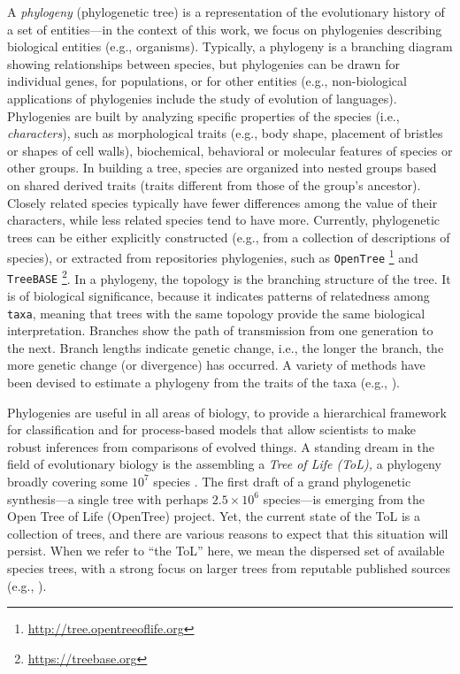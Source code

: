 \documentclass{new_tlp}
\begin{document}
A \emph{phylogeny} (phylogenetic tree) is a representation of the evolutionary history of a set of entities---in the context of
this work, we focus on phylogenies describing biological entities (e.g., organisms). Typically, 
a phylogeny is a branching diagram showing relationships between species, but phylogenies can be drawn for individual 
genes, for populations, or for other entities (e.g., non-biological applications of phylogenies include the study
of evolution of languages). Phylogenies are built by analyzing specific properties of the species
(i.e., \emph{characters}), such as morphological traits (e.g., body shape, placement of bristles or shapes of cell
walls), biochemical, behavioral or molecular features of species or other groups. In building a tree, species are organized into nested groups based on
shared derived traits (traits different from those of the group's ancestor). Closely related species typically have fewer 
differences among the value of their characters,  while less related 
species tend to have more.
Currently, phylogenetic trees can be either explicitly constructed (e.g., from a collection of descriptions of species), or extracted from repositories phylogenies, such as {\small \tt OpenTree} \footnote{{\small \url{http://tree.opentreeoflife.org}}} and {\small \tt TreeBASE} \footnote{{\small \url{https://treebase.org}}}. In a phylogeny, the topology is the branching structure of the tree. It is of  biological significance, because it indicates patterns of relatedness among {\small\tt taxa}, meaning that trees with the same topology provide the same biological interpretation. Branches show the path of transmission from one generation to the next. Branch lengths indicate genetic change, i.e., the longer the branch, the more genetic change (or divergence) has occurred. A variety of methods have been devised to estimate a phylogeny from the traits of the taxa (e.g., \cite{felse}).

 Phylogenies are
useful in all areas of biology,  to provide a hierarchical framework for classification and for
process-based models that allow scientists to make robust inferences from comparisons of evolved
things. 
A standing dream in the field of evolutionary biology is the assembling a \emph{Tree of Life (ToL),} 
a phylogeny broadly covering some
$10^7$ species \cite{ph1,ph2}. The first draft of a grand phylogenetic synthesis---a single tree with perhaps $2.5 \times 10^6$ 
species---is emerging  from the Open Tree of Life (OpenTree) project. Yet, the current state of the ToL is a
collection of trees, and there are various reasons to expect that this situation will persist. When we
refer to ``the ToL'' here, we mean the dispersed set of available species trees, with a strong focus on
larger trees from reputable published sources (e.g., \cite{ph4,birds,ph5}).
\end{document}
